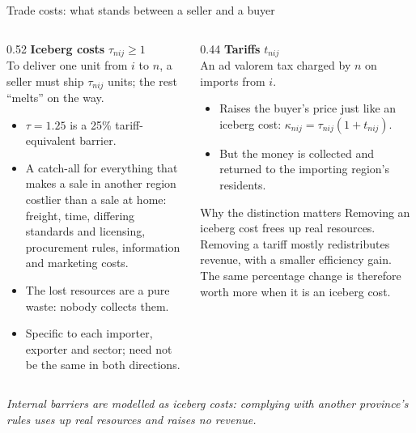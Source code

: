 \documentclass[aspectratio=169,9pt,t]{beamer}
\newcommand{\plain}[1]{{\color{ipgrey}\small\itshape #1}}
\begin{document}
\begin{frame}{Trade costs: what stands between a seller and a buyer}
  \begin{columns}[T]
    \begin{column}{0.52\textwidth}
      \textbf{Iceberg costs} $\tau_{nij}\ge 1$\\
      To deliver one unit from $i$ to $n$, a seller must ship
      $\tau_{nij}$ units; the rest ``melts'' on the way.
      \begin{itemize}
        \item $\tau=1.25$ is a 25\% tariff-equivalent barrier.
        \item A catch-all for everything that makes a sale in another
              region costlier than a sale at home: freight, time,
              differing standards and licensing, procurement rules,
              information and marketing costs.
        \item The lost resources are a pure waste: nobody collects them.
        \item Specific to each importer, exporter and sector; need not be
              the same in both directions.
      \end{itemize}
    \end{column}
    \begin{column}{0.44\textwidth}
      \textbf{Tariffs} $t_{nij}$\\
      An ad valorem tax charged by $n$ on imports from $i$.
      \begin{itemize}
        \item Raises the buyer's price just like an iceberg cost:
              $\kappa_{nij}=\tau_{nij}(1+t_{nij})$.
        \item But the money is collected and returned to the importing
              region's residents.
      \end{itemize}
      \begin{block}{Why the distinction matters}
        \small Removing an iceberg cost frees up real resources.
        Removing a tariff mostly redistributes revenue, with a smaller
        efficiency gain. The same percentage change is therefore worth
        more when it is an iceberg cost.
      \end{block}
    \end{column}
  \end{columns}
  \medskip
  \plain{Internal barriers are modelled as iceberg costs: complying with
  another province's rules uses up real resources and raises no revenue.}
\end{frame}
\end{document}
